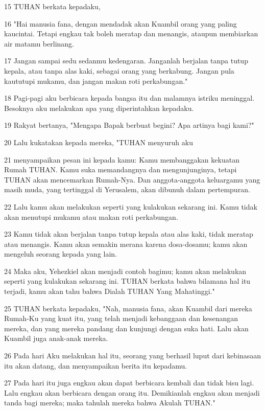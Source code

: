 \par 15 TUHAN berkata kepadaku,
\par 16 "Hai manusia fana, dengan mendadak akan Kuambil orang yang paling kaucintai. Tetapi engkau tak boleh meratap dan menangis, ataupun membiarkan air matamu berlinang.
\par 17 Jangan sampai sedu sedanmu kedengaran. Janganlah berjalan tanpa tutup kepala, atau tanpa alas kaki, sebagai orang yang berkabung. Jangan pula kaututupi mukamu, dan jangan makan roti perkabungan."
\par 18 Pagi-pagi aku berbicara kepada bangsa itu dan malamnya istriku meninggal. Besoknya aku melakukan apa yang diperintahkan kepadaku.
\par 19 Rakyat bertanya, "Mengapa Bapak berbuat begini? Apa artinya bagi kami?"
\par 20 Lalu kukatakan kepada mereka, "TUHAN menyuruh aku
\par 21 menyampaikan pesan ini kepada kamu: Kamu membanggakan kekuatan Rumah TUHAN. Kamu suka memandangnya dan mengunjunginya, tetapi TUHAN akan mencemarkan Rumah-Nya. Dan anggota-anggota keluargamu yang masih muda, yang tertinggal di Yerusalem, akan dibunuh dalam pertempuran.
\par 22 Lalu kamu akan melakukan seperti yang kulakukan sekarang ini. Kamu tidak akan menutupi mukamu atau makan roti perkabungan.
\par 23 Kamu tidak akan berjalan tanpa tutup kepala atau alas kaki, tidak meratap atau menangis. Kamu akan semakin merana karena dosa-dosamu; kamu akan mengeluh seorang kepada yang lain.
\par 24 Maka aku, Yehezkiel akan menjadi contoh bagimu; kamu akan melakukan seperti yang kulakukan sekarang ini. TUHAN berkata bahwa bilamana hal itu terjadi, kamu akan tahu bahwa Dialah TUHAN Yang Mahatinggi."
\par 25 TUHAN berkata kepadaku, "Nah, manusia fana, akan Kuambil dari mereka Rumah-Ku yang kuat itu, yang telah menjadi kebanggaan dan kesenangan mereka, dan yang mereka pandang dan kunjungi dengan suka hati. Lalu akan Kuambil juga anak-anak mereka.
\par 26 Pada hari Aku melakukan hal itu, seorang yang berhasil luput dari kebinasaan itu akan datang, dan menyampaikan berita itu kepadamu.
\par 27 Pada hari itu juga engkau akan dapat berbicara kembali dan tidak bisu lagi. Lalu engkau akan berbicara dengan orang itu. Demikianlah engkau akan menjadi tanda bagi mereka; maka tahulah mereka bahwa Akulah TUHAN."

